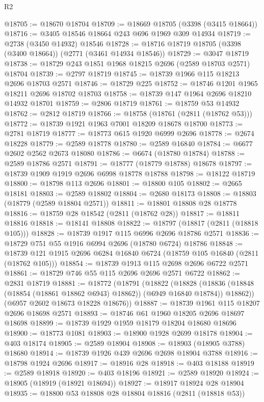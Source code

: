 \begin{lexlean}{R2}
\begin{coremodule}
@18705 := @18670 @18704
@18709 := @18669 @18705 (@3398 (@3415 @18664))
@18716 := @3405 @18546 @18664 @243 @696 @1969 @309 @14934
@18719 := @2738 (@3450 @14932) @18546
@18728 := @18716 @18719 @18705 (@3398 (@3400 @18664)) (@2771 (@3461 @14934 @18546))
@18729 := @3047 @18719
@18738 := @18729 @243 @1851 @1968 @18215 @2696 (@2589 @18703 @2571) @18704
@18739 := @2797 @18719
@18745 := @18739 @1966 @115 @18213 @2696 @18703 @2571
@18746 := @18729 @225
@18752 := @18746 @1201 @1965 @18211 @2696 @18702 @18703
@18758 := @18739 @147 @1964 @2696 @18210 @14932 @18701
@18759 := @2806 @18719
@18761 := @18759 @53 @14932
@18762 := @2812 @18719
@18766 := @18758 (@18761 (@2811 (@18762 @53)))
@18772 := @18739 @1921 @1963 @7001 @18209 @18678 @18700
@18773 := @2781 @18719
@18777 := @18773 @615 @1920 @6999 @2696
@18778 := @2674 @18228
@18779 := @2589 @18778
@18780 := @2589 @16840
@18784 := @6677 @2602 @2562 @2673 @18080
@18786 := @6674 (@18780 @18784)
@18788 := @2589 @18786 @2571
@18791 := @18777 (@18779 @18788) @18678
@18797 := @18739 @1909 @1919 @2696 @6998 @18778 @18788
@18798 := @18122 @18719
@18800 := @18798 @113 @2696
@18801 := @18800 @105
@18802 := @2665 @18181
@18803 := @2589 @18802
@18804 := @2680 @18173
@18808 := @18803 (@18779 (@2589 @18804 @2571))
@18811 := @18801 @18808 @28 @18778
@18816 := @18759 @28 @18542 (@2811 (@18762 @28))
@18817 := @18811 @18816
@18818 := @18141 @18808
@18822 := @18797 (@18817 (@2811 (@18818 @105)))
@18828 := @18739 @1917 @115 @6996 @2696 @18786 @2571
@18836 := @18729 @751 @55 @1916 @6994 @2696 (@18780 @6724) @18786
@18848 := @18739 @121 @1915 @2696 @6284 @16840 @6724 (@18759 @105 @16840 (@2811 (@18762 @105)))
@18854 := @18739 @1913 @115 @2698 @2696 @6722 @2571
@18861 := @18729 @746 @55 @115 @2696 @2696 @2571 @6722
@18862 := @2831 @18719
@18881 := @18772
    (@18791
      (@18822
        (@18828
          (@18836 (@18848 (@18854 (@18861 @18862 @6943) @18862)) (@6949 @16840 @18784))
          @18862))
      (@6957 @2602 @18673 @18228 @18676))
@18887 := @18739 @1961 @115 @18207 @2696 @18698 @2571
@18893 := @18746 @61 @1960 @18205 @2696 @18697 @18698
@18899 := @18739 @1929 @1959 @18179 @18204 @18680 @18696
@18900 := @18773 @1081
@18903 := @18900 @1928 @2699 @18178
@18904 := @403 @18174
@18905 := @2589 @18904
@18908 := @18903 (@18905 @3788) @18680
@18914 := @18739 @1926 @439 @2696 @2698 @18904 @3788
@18916 := @18798 @1924 @2696
@18917 := @18916 @28
@18918 := @403 @18188
@18919 := @2589 @18918
@18920 := @403 @18196
@18921 := @2589 @18920
@18924 := @18905 (@18919 (@18921 @18694))
@18927 := @18917 @18924 @28 @18904
@18935 := @18800 @53 @18808 @28 @18804 @18816 (@2811 (@18818 @53))

\end{coremodule}
\end{lexlean}
